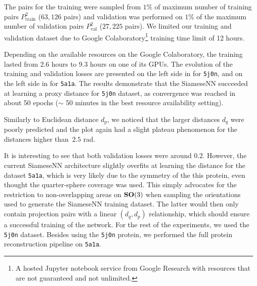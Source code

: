 The pairs for the training were sampled from $1\%$ of maximum number of training pairs $P_{\text{train}}^2$ ($63,126$ pairs) and validation was performed on $1\%$ of the maximum number of validation pairs $P_{\text{val}}^2$ ($27,225$ pairs).
We limited our training and validation dataset due to Google Colaboratory\footnote{A hosted Jupyter notebook service from Google Research with resources that are not guaranteed and not unlimited.} training time limit of 12 hours.

Depending on the available resources on the Google Colaboratory, the training lasted from 2.6 hours to 9.3 hours on one of its GPUs.
The evolution of the training and validation losses are presented on the left side in  for \texttt{5j0n}, and on the left side in  for \texttt{5a1a}.
The results demonstrate that the SiameseNN succeeded at learning a proxy distance for \texttt{5j0n} dataset, as convergence was reached in about 50 epochs ($\sim$ 50 minutes in the best resource availability setting).

Similarly to Euclidean distance $d_p$, we noticed that the larger distances $d_q$ were poorly predicted and the plot again had a slight plateau phenomenon for the distances higher than~$2.5$ rad.

It is interesting to see that both validation losses were around $0.2$.
However, the current SiameseNN architecture slightly overfits at learning the distance for the dataset \texttt{5a1a}, which is very likely due to the symmetry of the this protein, even thought the quarter-sphere coverage was used.
This simply advocates for the restriction to non-overlapping areas on $\mathrm{\mathbf{SO}}(3)$ when sampling the orientations used to generate the SiameseNN training dataset.
The latter would then only contain projection pairs with a linear $(d_q,d_p)$ relationship, which should ensure a successful training of the network.
For the rest of the experiments, we used the \texttt{5j0n} dataset.
Besides using the \texttt{5j0n} protein, we performed the full protein reconstruction pipeline on \texttt{5a1a}.

